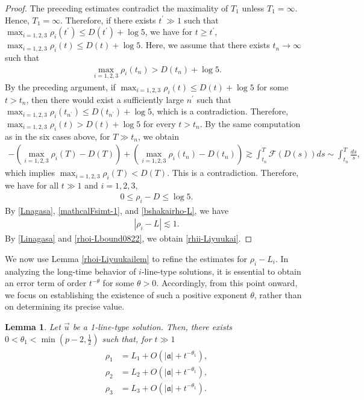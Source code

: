 \documentclass[10pt,a4paper]{amsart}
\newtheorem{lemma}[theorem]{Lemma}
\numberwithin{equation}{section}
\begin{document}
\begin{proof}
The preceding estimates contradict the maximality of $T_1$ unless $T_1=\infty$. Hence, $T_1=\infty$. Therefore, if there exists $t^{\prime}\gg 1$ such that $\max_{i=1,2,3}\rho_i(t^{\prime})\leq D(t^{\prime})+\log{5}$, we have for $t\geq t^{\prime}$, $\max_{i=1,2,3}\rho_i(t)\leq D(t)+\log{5}$. Here, we assume that there exists $t_n\to\infty$ such that 
\begin{align*}
\max_{i=1,2,3}\rho_i(t_n)>D(t_n)+\log{5}.
\end{align*}
By the preceding argument, if $\max_{i=1,2,3}\rho_i(t)\leq D(t)+\log{5}$ for some $t>t_n$, then there would exist a sufficiently large $n^{\prime}$ such that $\max_{i=1,2,3}\rho_i(t_{n^{\prime}})\leq D(t_{n^{\prime}})+\log{5}$, which is a contradiction. Therefore, $\max_{i=1,2,3}\rho_i(t)>D(t)+\log{5}$ for every $t>t_n$. By the same computation as in the six cases above, for $T\gg t_n$, we obtain
\begin{align*}
-\left(\max_{i=1,2,3}\rho_i(T)-D(T)\right)+\left(\max_{i=1,2,3}\rho_i(t_n)-D(t_n)\right)\gtrsim \int_{t_n}^T\mathcal{F}(D(s))ds\sim \int_{t_n}^T\frac{ds}{s},
\end{align*}
which implies $\max_{i=1,2,3}\rho_i(T)<D(T)$. This is a contradiction. Therefore, we have for all $t\gg 1$ and $i=1,2,3$,
\begin{align}\label{bshakairho-L}
0\leq \rho_i-D\leq \log{5}.
\end{align}
By \eqref{Lnagasa}, \eqref{mathcalFsimt-1}, and \eqref{bshakairho-L}, we have 
\begin{align}\label{rhoi-Lbound0822}
|\rho_i-L|\lesssim 1.
\end{align}
By \eqref{Linagasa} and \eqref{rhoi-Lbound0822}, we obtain \eqref{rhii-Liyuukai}.
\end{proof}
We now use Lemma \ref{rhoi-Liyuukailem} to refine the estimates for $\rho_i-L_i$. In analyzing the long-time behavior of $i$-line-type solutions, it is essential to obtain an error term of order $t^{-\theta}$ for some $\theta>0$. Accordingly, from this point onward, we focus on establishing the existence of such a positive exponent $\theta$, rather than on determining its precise value.
\begin{lemma}\label{rhoinagasalem}
Let $\vec{u}$ be a 1-line-type solution. Then, there exists $0<\theta_1<\min{(p-2,\frac{1}{2})}$ such that, for $t\gg 1$
\begin{align}\label{rhoinagasalemes}
\begin{aligned}
\rho_1&=L_1+O\left(|\mathfrak{a}|+t^{-\theta_1}\right),
\\
\rho_2&=L_2+O\left(|\mathfrak{a}|+t^{-\theta_1}\right),
\\
\rho_3&=L_3+O\left(|\mathfrak{a}|+t^{-\theta_1}\right).
\end{aligned}
\end{align}
\end{lemma}
\end{document}
